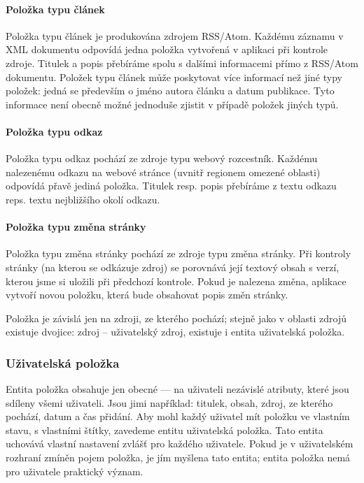 \paragraph{Položka typu článek}

Položka typu článek je produkována zdrojem RSS/Atom.
Každému záznamu v XML dokumentu odpovídá jedna položka vytvořená v aplikaci při kontrole zdroje.
Titulek a popis přebíráme spolu s dalšími informacemi přímo z RSS/Atom dokumentu.
Položek typu článek může poskytovat více informací než jiné typy položek: jedná se především o jméno autora článku a datum publikace.
Tyto informace není obecně možné jednoduše zjistit v případě položek jiných typů.

\paragraph{Položka typu odkaz}

Položka typu odkaz pochází ze zdroje typu webový rozcestník.
Každému nalezenému odkazu na webové stránce (uvnitř regionem omezené oblasti) odpovídá přavě jediná položka.
Titulek resp. popis přebíráme z textu odkazu reps. textu nejbližšího okolí odkazu.

\paragraph{Položka typu změna stránky}

Položka typu změna stránky pochází ze zdroje typu změna stránky.
Při kontroly stránky (na kterou se odkázuje zdroj) se porovnává její textový obsah s verzí, kterou jsme si uložili při předchozí kontrole.
Pokud je nalezena změna, aplikace vytvoří novou položku, která bude obsahovat popis změn stránky.

\bigskip{}

Položka je závislá jen na zdroji, ze kterého pochází; stejně jako v oblasti zdrojů existuje dvojice: zdroj -- uživatelský zdroj, existuje i entita uživatelská položka.

\subsubsection{Uživatelská položka}

Entita položka obsahuje jen obecné --- na uživateli nezávislé atributy, které jsou sdíleny všemi uživateli.
Jsou jimi například: titulek, obsah, zdroj, ze kterého pochází, datum a čas přidání.
Aby mohl každý uživatel mít položku ve vlastním stavu, s vlastními štítky, zavedeme entitu uživatelská položka.
Tato entita uchovává vlastní nastavení zvlášť pro každého uživatele.
Pokud je v uživatelském rozhraní zmíněn pojem položka, je jím myšlena tato entita; entita položka nemá pro uživatele praktický význam.

